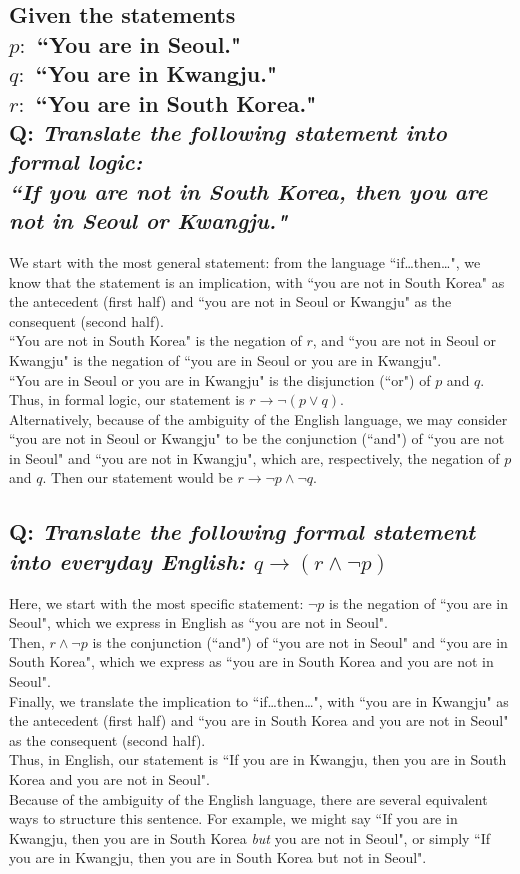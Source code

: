 \documentclass{article}
\begin{document}
\subsection*{{\normalsize Given the statements\\
$p:$ ``You are in Seoul."\\
$q:$ ``You are in Kwangju."\\
$r:$ ``You are in South Korea."}\\[1ex]
Q: {\em Translate the following statement into formal logic:\\
``If you are not in South Korea, then you are not in Seoul or Kwangju."}}
We start with the most general statement: from the language ``if\ldots then\ldots", we know that the statement is an implication, with ``you are not in South Korea" as the antecedent (first half) and ``you are not in Seoul or Kwangju" as the consequent (second half).\\[1ex]
``You are not in South Korea" is the negation of $r$, and ``you are not in Seoul or Kwangju" is the negation of ``you are in Seoul or you are in Kwangju".\\[1ex]
``You are in Seoul or you are in Kwangju" is the disjunction (``or") of $p$ and $q$.\\[1ex]
Thus, in formal logic, our statement is $r\to\neg(p\vee q)$.\\[1ex]
Alternatively, because of the ambiguity of the English language, we may consider ``you are not in Seoul or Kwangju" to be the conjunction (``and") of ``you are not in Seoul" and ``you are not in Kwangju", which are, respectively, the negation of $p$ and $q$. Then our statement would be $r\to\neg p\wedge\neg q$.

\subsection*{Q: {\em Translate the following formal statement into everyday English:
$q\to(r\wedge\neg p)$}}
Here, we start with the most specific statement: $\neg p$ is the negation of ``you are in Seoul", which we express in English as ``you are not in Seoul".\\[1ex]
Then, $r\wedge\neg p$ is the conjunction (``and") of ``you are not in Seoul" and ``you are in South Korea", which we express as ``you are in South Korea and you are not in Seoul".\\[1ex]
Finally, we translate the implication to ``if\ldots then\ldots", with ``you are in Kwangju" as the antecedent (first half) and ``you are in South Korea and you are not in Seoul" as the consequent (second half).\\[1ex]
Thus, in English, our statement is ``If you are in Kwangju, then you are in South Korea and you are not in Seoul".\\[1ex]
Because of the ambiguity of the English language, there are several equivalent ways to structure this sentence. For example, we might say ``If you are in Kwangju, then you are in South Korea \textit{but} you are not in Seoul", or simply ``If you are in Kwangju, then you are in South Korea but not in Seoul".
\end{document}
